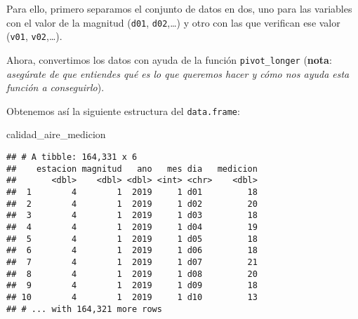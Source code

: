 \documentclass[]{article}
\newenvironment{Shaded}{\begin{snugshade}}{\end{snugshade}}
\newcommand{\DataTypeTok}[1]{\textcolor[rgb]{0.13,0.29,0.53}{#1}}
\newcommand{\KeywordTok}[1]{\textcolor[rgb]{0.13,0.29,0.53}{\textbf{#1}}}
\newcommand{\NormalTok}[1]{#1}
\newcommand{\OperatorTok}[1]{\textcolor[rgb]{0.81,0.36,0.00}{\textbf{#1}}}
\newcommand{\StringTok}[1]{\textcolor[rgb]{0.31,0.60,0.02}{#1}}
\begin{document}
Para ello, primero separamos el conjunto de datos en dos, uno para las
variables con el valor de la magnitud (\texttt{d01},
\texttt{d02},\ldots{}) y otro con las que verifican ese valor
(\texttt{v01}, \texttt{v02},\ldots{}).

\begin{Shaded}
\end{Shaded}

Ahora, convertimos los datos con ayuda de la función
\texttt{pivot\_longer} (\textbf{nota}: \emph{asegúrate de que entiendes
qué es lo que queremos hacer y cómo nos ayuda esta función a
conseguirlo}).

\begin{Shaded}
\end{Shaded}

Obtenemos así la siguiente estructura del \texttt{data.frame}:

\begin{Shaded}
\begin{Highlighting}[]
\NormalTok{calidad_aire_medicion}
\end{Highlighting}
\end{Shaded}

\begin{verbatim}
## # A tibble: 164,331 x 6
##    estacion magnitud   ano   mes dia   medicion
##       <dbl>    <dbl> <dbl> <int> <chr>    <dbl>
##  1        4        1  2019     1 d01         18
##  2        4        1  2019     1 d02         20
##  3        4        1  2019     1 d03         18
##  4        4        1  2019     1 d04         19
##  5        4        1  2019     1 d05         18
##  6        4        1  2019     1 d06         18
##  7        4        1  2019     1 d07         21
##  8        4        1  2019     1 d08         20
##  9        4        1  2019     1 d09         18
## 10        4        1  2019     1 d10         13
## # ... with 164,321 more rows
\end{verbatim}
\end{document}

